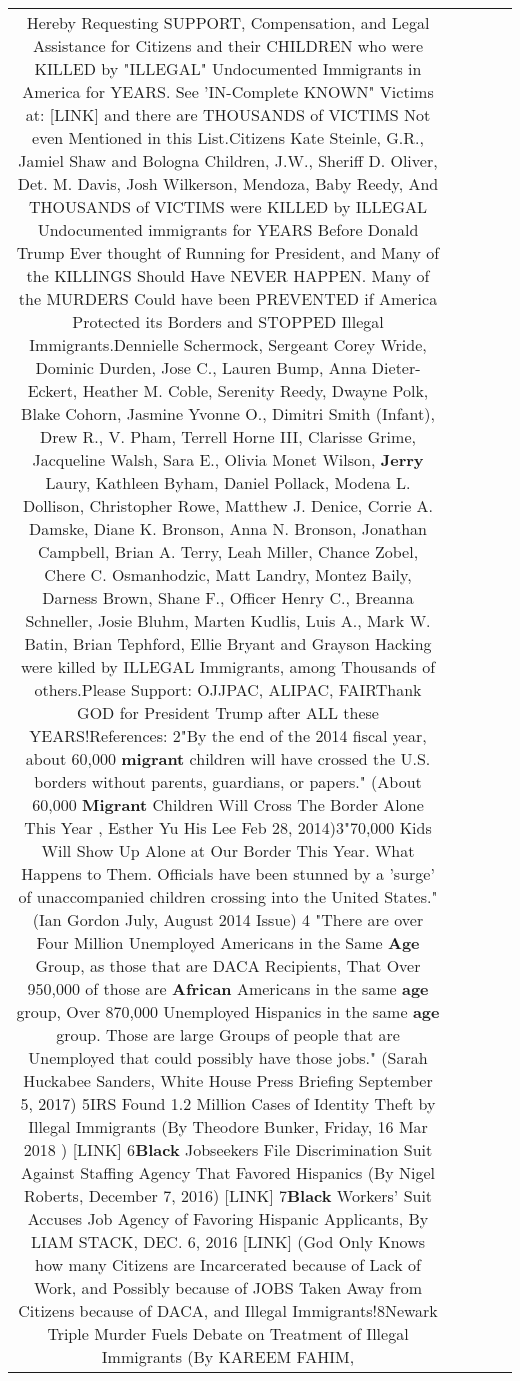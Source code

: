 \documentclass[11pt]{article}
\newlength\mylength
\begin{document}
\begin{center}
\begin{longtable}{|C{.65\mylength}|C{.30\mylength}|C{.12\mylength}|C{.12\mylength}|C{.12\mylength}|}
  \small Hereby Requesting SUPPORT, Compensation,  and Legal Assistance for Citizens and their CHILDREN who were KILLED by "ILLEGAL" Undocumented Immigrants in America for YEARS. See 'IN-Complete KNOWN" Victims at:  [LINK] and there are THOUSANDS of VICTIMS Not even Mentioned in this List.Citizens Kate Steinle, G.R., Jamiel Shaw and Bologna Children, J.W., Sheriff D. Oliver, Det. M. Davis, Josh Wilkerson, Mendoza, Baby Reedy, And THOUSANDS of VICTIMS were KILLED by ILLEGAL Undocumented immigrants for YEARS Before Donald Trump Ever thought of Running for President, and Many of the KILLINGS Should Have NEVER HAPPEN. Many of the MURDERS Could have been PREVENTED if America Protected its Borders and STOPPED Illegal Immigrants.Dennielle Schermock, Sergeant Corey Wride, Dominic Durden, Jose C., Lauren Bump, Anna Dieter-Eckert, Heather M. Coble, Serenity Reedy, Dwayne Polk, Blake Cohorn, Jasmine Yvonne O., Dimitri Smith (Infant), Drew R., V. Pham, Terrell Horne III, Clarisse Grime, Jacqueline Walsh, Sara E., Olivia Monet Wilson, \textbf{Jerry} Laury, Kathleen Byham, Daniel Pollack, Modena L. Dollison, Christopher Rowe, Matthew J. Denice, Corrie A. Damske, Diane K. Bronson, Anna N. Bronson, Jonathan Campbell, Brian A. Terry, Leah Miller, Chance Zobel, Chere C. Osmanhodzic, Matt Landry, Montez Baily, Darness Brown, Shane F., Officer Henry C., Breanna Schneller, Josie Bluhm, Marten Kudlis, Luis A., Mark W. Batin, Brian Tephford, Ellie Bryant and Grayson Hacking  were killed by ILLEGAL Immigrants, among Thousands of others.Please Support: OJJPAC, ALIPAC, FAIRThank GOD for President Trump after ALL these YEARS!References: 2"By the end of the 2014 fiscal year, about 60,000 \textbf{migrant} children will have crossed the U.S. borders without parents, guardians, or papers." (About 60,000 \textbf{Migrant} Children Will Cross The Border Alone This Year , Esther Yu His Lee Feb 28, 2014)3"70,000 Kids Will Show Up Alone at Our Border This Year. What Happens to Them. Officials have been stunned by a 'surge' of unaccompanied children crossing into the United States." (Ian Gordon July, August 2014 Issue) 4 "There are over Four Million Unemployed Americans in the Same \textbf{Age} Group, as those that are DACA Recipients, That Over 950,000 of those are \textbf{African} Americans in the same \textbf{age} group, Over 870,000 Unemployed Hispanics in the same \textbf{age} group. Those are large Groups of people that are Unemployed that could possibly have those jobs." (Sarah Huckabee Sanders, White House Press Briefing September 5, 2017) 5IRS Found 1.2 Million Cases of Identity Theft by Illegal Immigrants (By Theodore Bunker, Friday, 16 Mar 2018 ) [LINK] 6\textbf{Black} Jobseekers File Discrimination Suit Against Staffing Agency That Favored Hispanics (By Nigel Roberts, December 7, 2016)  [LINK] 7\textbf{Black} Workers' Suit Accuses Job Agency of Favoring Hispanic Applicants, By LIAM STACK, DEC. 6, 2016  [LINK]  (God Only Knows how many Citizens are Incarcerated because of Lack of Work, and Possibly because of JOBS Taken Away from Citizens because of DACA, and Illegal Immigrants!8Newark Triple Murder Fuels Debate on Treatment of Illegal Immigrants (By KAREEM FAHIM, 
\end{longtable}
\end{center}
\end{document}
